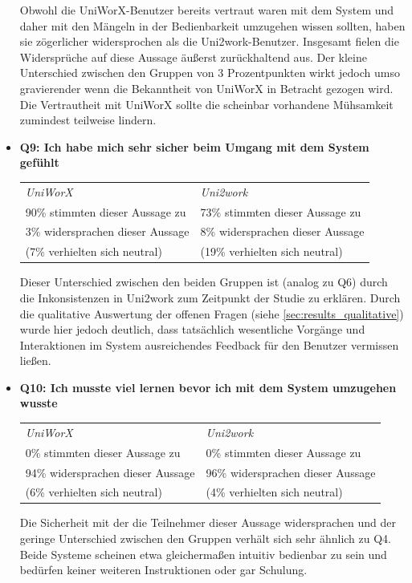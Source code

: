 \documentclass[11pt,a4paper,twoside,ngerman]{article}
\begin{document}
\begin{itemize}
    \smallskip
    Obwohl die UniWorX-Benutzer bereits vertraut waren mit dem System und daher mit den Mängeln in der Bedienbarkeit umzugehen wissen sollten, haben sie zögerlicher widersprochen als die Uni2work-Benutzer. Insgesamt fielen die Widersprüche auf diese Aussage äußerst zurückhaltend aus. Der kleine Unterschied zwischen den Gruppen von 3 Prozentpunkten wirkt jedoch umso gravierender wenn die Bekanntheit von UniWorX in Betracht gezogen wird. Die Vertrautheit mit UniWorX sollte die scheinbar vorhandene Mühsamkeit zumindest teilweise lindern.
    \item \textbf{Q9: Ich habe mich sehr sicher beim Umgang mit dem System gefühlt}
    
    \smallskip
    \begin{tabular}{p{6.5cm}|p{6.5cm}}
        \textit{UniWorX} & \textit{Uni2work} \\
        90\% stimmten dieser Aussage zu & 73\% stimmten dieser Aussage zu \\
        3\% widersprachen dieser Aussage & 8\% widersprachen dieser Aussage \\
        (7\% verhielten sich neutral) &  (19\% verhielten sich neutral)
    \end{tabular}
    
    \smallskip
    Dieser Unterschied zwischen den beiden Gruppen ist (analog zu Q6) durch die Inkonsistenzen in Uni2work zum Zeitpunkt der Studie zu erklären. Durch die qualitative Auswertung der offenen Fragen (siehe \autoref{sec:results_qualitative}) wurde hier jedoch deutlich, dass tatsächlich wesentliche Vorgänge und Interaktionen im System ausreichendes Feedback für den Benutzer vermissen ließen.
    \item \textbf{Q10: Ich musste viel lernen bevor ich mit dem System umzugehen wusste}
    
    \smallskip
    \begin{tabular}{p{6.5cm}|p{6.5cm}}
        \textit{UniWorX} & \textit{Uni2work} \\
        0\% stimmten dieser Aussage zu & 0\% stimmten dieser Aussage zu \\
        94\% widersprachen dieser Aussage & 96\% widersprachen dieser Aussage \\
        (6\% verhielten sich neutral) &  (4\% verhielten sich neutral)
    \end{tabular}
    
    \smallskip
    Die Sicherheit mit der die Teilnehmer dieser Aussage widersprachen und der geringe Unterschied zwischen den Gruppen verhält sich sehr ähnlich zu Q4. Beide Systeme scheinen etwa gleichermaßen intuitiv bedienbar zu sein und bedürfen keiner weiteren Instruktionen oder gar Schulung.
\end{itemize}
\end{document}
